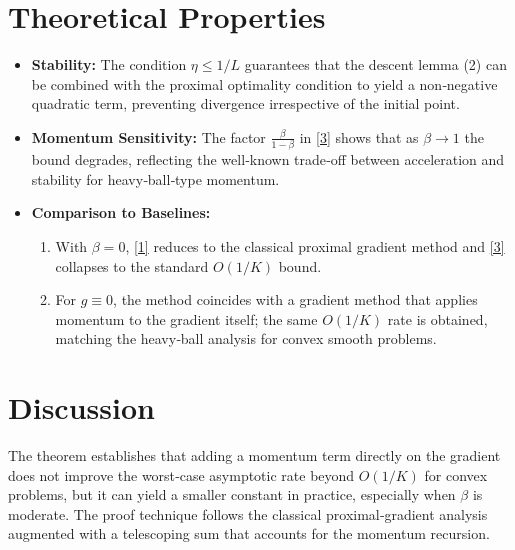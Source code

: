 \documentclass{article}
\begin{document}
\section*{Theoretical Properties}
\begin{itemize}
\item \textbf{Stability:} The condition $\eta\le 1/L$ guarantees that the descent lemma (2) can be combined with the proximal optimality condition to yield a non‑negative quadratic term, preventing divergence irrespective of the initial point.
\item \textbf{Momentum Sensitivity:} The factor $\frac{\beta}{1-\beta}$ in \eqref{3} shows that as $\beta\to 1$ the bound degrades, reflecting the well‑known trade‑off between acceleration and stability for heavy‑ball‑type momentum.
\item \textbf{Comparison to Baselines:}
    \begin{enumerate}
    \item With $\beta=0$, \eqref{1} reduces to the classical proximal gradient method and \eqref{3} collapses to the standard $O(1/K)$ bound.
    \item For $g\equiv0$, the method coincides with a gradient method that applies momentum to the gradient itself; the same $O(1/K)$ rate is obtained, matching the heavy‑ball analysis for convex smooth problems.
    \end{enumerate}
\end{itemize}

\section*{Discussion}
The theorem establishes that adding a momentum term directly on the gradient does not improve the worst‑case asymptotic rate beyond $O(1/K)$ for convex problems, but it can yield a smaller constant in practice, especially when $\beta$ is moderate. The proof technique follows the classical proximal‑gradient analysis augmented with a telescoping sum that accounts for the momentum recursion.

\newpage
\end{document}
